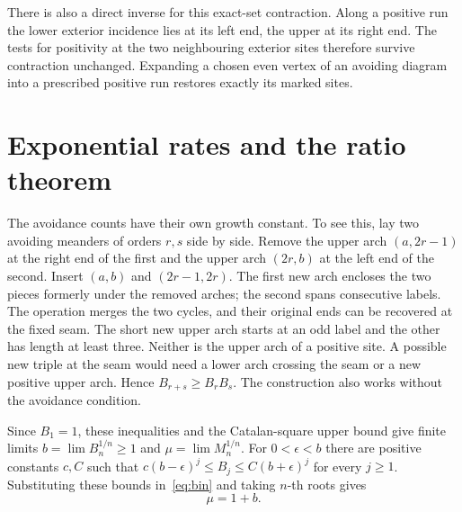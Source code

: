 \documentclass[11pt]{article}
\begin{document}
There is also a direct inverse for this exact-set contraction. Along
a positive run the lower exterior incidence lies at its left end,
the upper at its right end. The tests for positivity at the two
neighbouring exterior sites therefore survive contraction unchanged.
Expanding a chosen even vertex of an avoiding diagram into a prescribed
positive run restores exactly its marked sites.

\section{Exponential rates and the ratio theorem}
The avoidance counts have their own growth constant. To see this, lay
two avoiding meanders of orders \(r,s\) side by side. Remove the upper
arch \((a,2r-1)\) at the right end of the first and the upper arch
\((2r,b)\) at the left end of the second. Insert
\((a,b)\) and \((2r-1,2r)\). The first new arch encloses the two
pieces formerly under the removed arches; the second spans consecutive
labels. The operation merges the two cycles, and their original ends
can be recovered at the fixed seam. The short new upper arch starts at
an odd label and the other has length at least three. Neither is the
upper arch of a positive site. A possible new triple at the seam would
need a lower arch crossing the seam or a new positive upper arch.
Hence \(B_{r+s}\ge B_rB_s\). The construction also works without the
avoidance condition.

Since \(B_1=1\), these inequalities and the Catalan-square upper bound
give finite limits \(b=\lim B_n^{1/n}\ge1\) and
\(\mu=\lim M_n^{1/n}\). For \(0<\epsilon<b\) there are positive
constants \(c,C\) such that
\(c(b-\epsilon)^j\le B_j\le C(b+\epsilon)^j\) for every \(j\ge1\).
Substituting these bounds in~\eqref{eq:bin} and taking \(n\)-th roots gives
\begin{equation}\label{eq:base}
                      \mu=1+b .
\end{equation}
\end{document}
